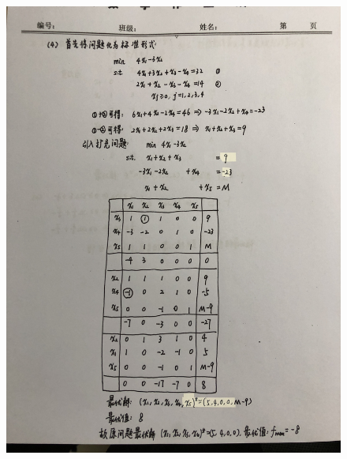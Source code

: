 \documentclass[a4paper]{article}
\begin{document}
\begin{figure}[htbp]
	\centering
	\includegraphics[height=23cm]{2.JPG}
\end{figure}
\end{document}
